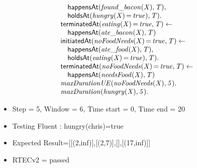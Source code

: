 \documentclass[8pt]{beamer}
\DeclareMathOperator{\val}{=}  %
\def \patsize {}
\def\happensAt{\textsf{\patsize happensAt}}
\def\holdsAt{\textsf{\patsize holdsAt}}
\def\initiatedAt{\textsf{\patsize initiatedAt}}
\def\terminatedAt{\textsf{\patsize terminatedAt}}
\newenvironment{mysplit}%
  {\arraycolsep 0pt \begin{array}{l}}%
  {\end{array}}
\begin{document}
\begin{frame}
\begin{minipage}{0.55\linewidth}
\begin{align*}
\begin{mysplit}
                \quad    \happensAt\mathit{(found\_bacon(X),T),}\\
                \quad    \holdsAt\mathit{(hungry(X)\val true),T).}\\
                \terminatedAt\mathit{(eating(X)\val true,T)\leftarrow}\\
                \quad    \happensAt\mathit{(ate\_bacon(X),T)}\\
                \initiatedAt\mathit{(noFoodNeeds(X)\val true,T)\leftarrow}\\
                \quad    \happensAt\mathit{(ate\_food(X),T),}\\
                \quad    \holdsAt\mathit{(eating(X)\val true),T).}\\
                \terminatedAt\mathit{(noFoodNeeds(X)\val true,T)\leftarrow}\\
                \quad    \happensAt\mathit{(needsFood(X),T)}\\
                \mathit{maxDurationUE(noFoodNeeds(X),5).}\\
                \mathit{maxDuration(hungry(X),5).}\\
            \end{mysplit}
        \end{align*}
    \end{minipage}
    \begin{itemize}
        \item  Step = 5, Window = 6, Time start = 0, Time end = 20
        \item Testing Fluent :  hungry(chris)=true
        \item Expected Result=[[(2,inf)],[(2,7)],[],[(17,inf)]]
        \item RTECv2 = passed
    \end{itemize}
\end{frame}
\end{document}
